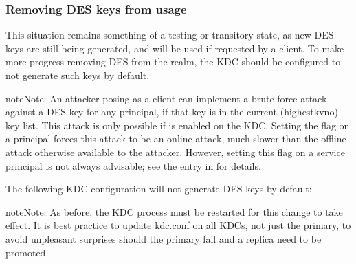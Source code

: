 \documentclass[letterpaper,10pt,english]{sphinxmanual}
\begin{document}
\subsubsection{Removing DES keys from usage}
\label{\detokenize{admin/advanced/retiring-des:removing-des-keys-from-usage}}
\sphinxAtStartPar
This situation remains something of a testing or transitory state,
as new DES keys are still being generated, and will be used if requested
by a client.  To make more progress removing DES from the realm, the KDC
should be configured to not generate such keys by default.

\begin{sphinxadmonition}{note}{Note:}
\sphinxAtStartPar
An attacker posing as a client can implement a brute force attack against
a DES key for any principal, if that key is in the current (highest\sphinxhyphen{}kvno)
key list.  This attack is only possible if 
is enabled on the KDC.  Setting the  flag on a
principal forces this attack to be an online attack, much slower than
the offline attack otherwise available to the attacker.  However, setting
this flag on a service principal is not always advisable; see the entry in
{\hyperref[\detokenize{admin/admin_commands/kadmin_local:add-principal}]{}} for details.
\end{sphinxadmonition}

\sphinxAtStartPar
The following KDC configuration will not generate DES keys by default:

\begin{sphinxVerbatim}[commandchars=\\\{\}]
\PYG{p}{[}\PYG{p}{]}
          
                     
\end{sphinxVerbatim}

\begin{sphinxadmonition}{note}{Note:}
\sphinxAtStartPar
As before, the KDC process must be restarted for this change to take
effect.  It is best practice to update kdc.conf on all KDCs, not just the
primary, to avoid unpleasant surprises should the primary fail and a
replica need to be promoted.
\end{sphinxadmonition}
\end{document}
